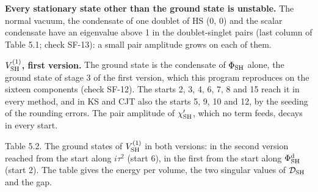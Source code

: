 \documentclass[
  10pt,
]{article}
\begin{document}
\textbf{Every stationary state other than the ground state is unstable.}
The normal vacuum, the condensate of one doublet of HS (0, 0) and the
scalar condensate have an eigenvalue above 1 in the doublet-singlet
pairs (last column of Table 5.1; check SF-13): a small pair amplitude
grows on each of them.

\textbf{\(V^{(1)}_{\rm SH}\), first version.} The ground state is the
condensate of \(\Phi_{\rm SH}\) alone, the ground state of stage 3 of
the first version, which this program reproduces on the sixteen
components (check SF-12). The starts 2, 3, 4, 6, 7, 8 and 15 reach it in
every method, and in KS and CJT also the starts 5, 9, 10 and 12, by the
seeding of the rounding errors. The pair amplitude of
\(\chi'_{\rm SH}\), which no term feeds, decays in every start.

Table 5.2. The ground states of \(V^{(1)}_{\rm SH}\) in both versions:
in the second version reached from the start along \(i\tau^2\) (start
6), in the first from the start along \(\Phi^{\rm d}_{\rm SH}\) (start
2). The table gives the energy per volume, the two singular values of
\(\mathcal D_{\rm SH}\) and the gap.
\end{document}
